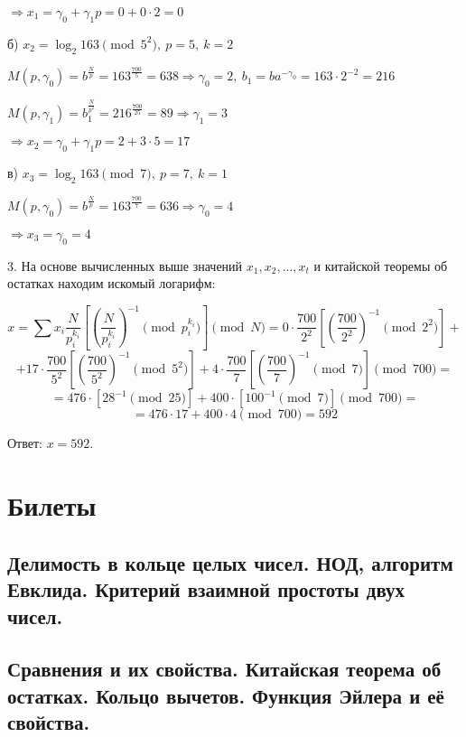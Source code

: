 \documentclass[a4paper,11pt,openany]{book}
\begin{document}
\noindent $\Rightarrow x_1 = \gamma_0 + \gamma_1 p = 0 + 0 \cdot 2 = 0$

б) $x_2 = \log_2 163 \pmod { 5^2 }, \ p = 5, \ k = 2$

\noindent $M(p, \gamma_0) = b ^ { \frac{N}{p} } = 163 ^ { \frac{700}{5} } = 638 \Rightarrow \gamma_0 = 2, \ b_1 = ba^{-\gamma_0} = 163 \cdot 2 ^ {-2} = 216$

\noindent $M(p, \gamma_1) = b_1 ^ { \frac{N}{p^2} } = 216 ^ { \frac{700}{25} } = 89 \Rightarrow \gamma_1 = 3$

\noindent $\Rightarrow x_2 = \gamma_0 + \gamma_1 p = 2 + 3 \cdot 5 = 17$

в) $x_3 = \log_2 163 \pmod { 7 }, \ p = 7, \ k = 1$

\noindent $M(p, \gamma_0) = b ^ { \frac{N}{p} } = 163 ^ { \frac{700}{7} } = 636 \Rightarrow \gamma_0 = 4$

\noindent $\Rightarrow x_3 = \gamma_0 = 4$

3. На основе вычисленных выше значений $x_1, x_2, ..., x_t$ и китайской теоремы об остатках находим искомый логарифм:

$$x = \sum x_i \frac{N}{p_i^{k_i}} [ ( \frac{N}{p_i^{k_i}} ) ^ {-1} \!\!\!\!\pmod {p_i^{k_i}} ] \!\!\!\!\pmod N = 0 \cdot \frac{700}{2^2} [ (\frac{700}{2^2}) ^ {-1} \!\!\!\!\pmod {2^2}] + $$ 
$$+ 17 \cdot \frac{700}{5^2} [ (\frac{700}{5^2}) ^ {-1} \!\!\!\!\pmod {5^2}] + 4 \cdot \frac{700}{7} [ (\frac{700}{7}) ^ {-1} \!\!\!\!\pmod 7]  \pmod {700} = $$
$$ = 476 \cdot [ 28 ^ {-1} \!\!\!\!\pmod {25}] + 400 \cdot [100 ^ {-1} \!\!\!\!\pmod 7] \pmod {700} = $$
$$ = 476 \cdot 17 + 400 \cdot 4 \pmod {700} = 592$$

\noindent Ответ: $x = 592$.

\section{}

\chapter{Билеты}
\section{Делимость в кольце целых чисел. НОД, алгоритм Евклида. Критерий взаимной простоты двух чисел.}
\section{Сравнения и их свойства. Китайская теорема об остатках. Кольцо вычетов. Функция Эйлера и её свойства.}
\end{document}
